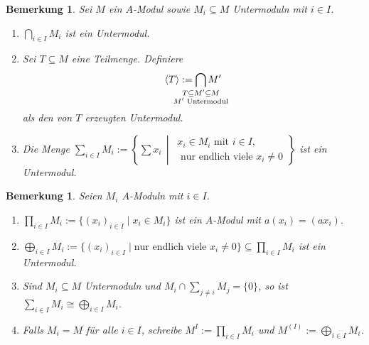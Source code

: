 \documentclass[12pt,a4paper]{scrartcl}
\theoremstyle{cplain}
\theoremstyle{cdef}
\newtheorem{beme}[thmcounter]{Bemerkung}
\begin{document}
\begin{beme}
	Sei $M$ ein $A$-Modul sowie $M_i\subseteq M$ Untermoduln mit $i\in I$.
	\begin{enumerate}
		\item $\bigcap\limits_{i\in I} M_i$ ist ein Untermodul.
		\item Sei $T\subseteq M$ eine Teilmenge. Definiere
		\[\<T\> := \bigcap_{\mathclap{\substack{T\subseteq M'\subseteq M\\\text{$M'$ Untermodul}}}} M'\] als den von $T$ erzeugten Untermodul.
		\item Die Menge $\sum\limits_{i\in I} M_i  := \left\{\sum x_i \,\middle|\, \substack{x_i \in M_i \text{ mit }i\in I,\\\text{ nur endlich viele } x_i\neq 0}\right\}$ ist ein Untermodul.
	\end{enumerate}
\end{beme}
\begin{beme}
	Seien $M_i$ $A$-Moduln mit $i\in I$.
	\begin{enumerate}
		\item $\prod\limits_{i\in I} M_i := \{(x_i)_{i\in I}\mid x_i\in M_i\}$ ist ein $A$-Modul mit $a(x_i) = (ax_i)$.
		\item $\bigoplus\limits_{i\in I} M_i := \{(x_i)_{i\in I}\mid\text{nur endlich viele }x_i\neq 0\}\subseteq \prod\limits_{i\in I}M_i$ ist ein Untermodul.
        \item Sind $M_i\subseteq M$ Untermoduln und $M_i\cap \sum\limits_{j\neq i} M_j = \{0\}$, so ist $\sum\limits_{i\in I} M_i\cong \bigoplus\limits_{i\in I} M_i$.
        \item Falls $M_i = M$ für alle $i \in I$, schreibe $M^I := \prod\limits_{i\in I} M_i$ und $M^{(I)} := \bigoplus\limits_{i\in I}M_i$.
	\end{enumerate}
\end{beme}
\end{document}
